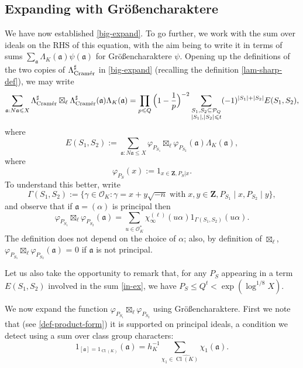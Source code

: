 \documentclass[11pt,reqno]{amsart}
\numberwithin{equation}{section}
\theoremstyle{definition}
\theoremstyle{remark}
\newcommand{\mc}{\mathcal}
\newcommand{\mf}{\mathfrak}
\renewcommand{\le}{\leqslant}
\newcommand\Z{\mathbf{Z}}
\newcommand\cramer{{\textnormal{Cram\'er}}}
\newcommand\classgroup{\operatorname{Cl}(K)}
\renewcommand\O{\mathcal{O}}
\begin{document}
\subsection{Expanding with Gr\"o{\ss}encharaktere}
We have now established \cref{big-expand}. To go further, we work with the sum over ideals on the RHS of this equation, with the aim being to write it in terms of sums $\sum_{\mf{a}} \Lambda_K(\mf{a}) \psi(\mf{a})$ for Gr\"o{\ss}encharaktere $\psi$. Opening up the definitions of the two copies of $\Lambda_{\cramer}^{\sharp}$ in \cref{big-expand} (recalling the definition \cref{lam-sharp-def}), we may write 
\begin{equation}\label{in-ex} \sum_{\mf{a} : N\mf{a} \le X}  \Lambda_{\cramer}^{\sharp}\boxtimes_{\ell} \Lambda_{\cramer}^{\sharp}(\mf{a}) \Lambda_K(\mf{a}) = \prod_{p \le Q} \Big(1 - \frac{1}{p}\Big)^{-2} \sum_{\substack{S_1, S_2 \subseteq \mc{P}_Q \\ |S_1|, |S_2| \le t}} (-1)^{|S_1| + |S_2|} E(S_1, S_2),\end{equation}
where
\begin{equation}\label{es1s2-def}
E(S_1, S_2) := \sum_{\mf{a} : N\mf{a} \le X} \varphi_{P_{S_1}} \boxtimes_{\ell} \varphi_{P_{S_2}}(\mf{a}) \Lambda_K(\mf{a}),\end{equation} where 
\[ \varphi_{P_S}(x) := 1_{x \in \Z, P_S | x}.\]
To understand this better, write 
\begin{equation}\label{rd1d2-def} \Gamma(S_1, S_2) := \{ \gamma \in \O_K : \gamma = x + y \sqrt{-n} \; \mbox{with} \; x, y \in \Z, P_{S_1} \mid x, P_{S_2} \mid y\}, \end{equation} and observe that if $\mf{a} = (\alpha)$ is principal then
\begin{equation}\label{psi1-times-psi2} \varphi_{P_{S_1}} \boxtimes_{\ell} \varphi_{P_{S_2}}(\mf{a}) = \sum_{u \in \O_K^*} \chi_{\infty}^{(\ell)}(u \alpha) 1_{\Gamma(S_1, S_2)} (u \alpha).\end{equation} The definition does not depend on the choice of $\alpha$; also, by definition of $\boxtimes_{\ell}$, $\varphi_{P_{S_1}} \boxtimes_{\ell} \varphi_{P_{S_2}}(\mf{a})$ = 0 if $\mf{a}$ is not principal.


 
 Let us also take the opportunity to remark that, for any $P_S$ appearing  in a term $E(S_1, S_2)$ involved in the sum \cref{in-ex}, we have $P_S \le Q^t < \exp(\log^{1/8} X)$. 

We now expand the function $\varphi_{P_{S_1}} \boxtimes_{\ell} \varphi_{P_{S_2}}$ using Gr\"o{\ss}encharaktere. First we note that (see \cref{def-product-form}) it is supported on principal ideals, a condition we detect using a sum over class group characters:
\begin{equation}\label{detect-principal} 1_{[\mf{a}] = 1_{\classgroup}}(\mf{a}) = h_K^{-1}\sum_{\chi_1 \in \widehat{\classgroup}} \chi_1(\mf{a}).\end{equation} 
\end{document}
